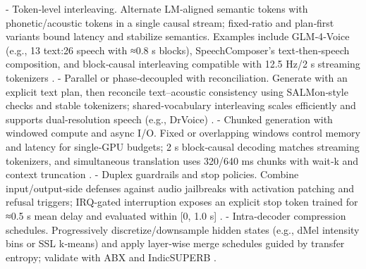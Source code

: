 - Token‑level interleaving. Alternate LM‑aligned semantic tokens with phonetic/acoustic tokens in a single causal stream; fixed‑ratio and plan‑first variants bound latency and stabilize semantics. Examples include GLM‑4‑Voice (e.g., 13 text:26 speech with ≈0.8 s blocks), SpeechComposer’s text‑then‑speech composition, and block‑causal interleaving compatible with 12.5 Hz/2 s streaming tokenizers \cite{zeng2024glm4voicetowardsintelligenthumanlikeends,wu2024speechcomposerunifyingmultiplespeechtask,zeng2024scalingspeechtextpretrainingsyntheticint,har-tuv2025pastphoneticacousticspeechtokenizer,jo2025lmsptalignedsemanticdistillationspeechto,vashishth2024stabspeechtokenizerassessmentbenchmark,cui2025thinkbeforeyoutalkenhancingmeaningfuldia}.
- Parallel or phase‑decoupled with reconciliation. Generate with an explicit text plan, then reconcile text–acoustic consistency using SALMon‑style checks and stable tokenizers; shared‑vocabulary interleaving scales efficiently and supports dual‑resolution speech (e.g., DrVoice) \cite{maimon2025scalinganalysisinterleavedspeechtextlang,maimon2025salmonsuiteacousticlanguagemodelevaluati,tan2025drvoiceparallelspeechtextvoiceconversati,vashishth2024stabspeechtokenizerassessmentbenchmark,wu2024speechcomposerunifyingmultiplespeechtask,zeng2024glm4voicetowardsintelligenthumanlikeends}.
- Chunked generation with windowed compute and async I/O. Fixed or overlapping windows control memory and latency for single‑GPU budgets; 2 s block‑causal decoding matches streaming tokenizers, and simultaneous translation uses 320/640 ms chunks with wait‑k and context truncation \cite{zeng2024scalingspeechtextpretrainingsyntheticint,guo2025streamuniachievingstreamingspeechtransla,maimon2025slammingtrainingspeechlanguagemodelonegp,chen2023reducingbarriersselfsupervisedlearninghu}.
- Duplex guardrails and stop policies. Combine input/output‑side defenses against audio jailbreaks with activation patching and refusal triggers; IRQ‑gated interruption exposes an explicit stop token trained for ≈0.5 s mean delay and evaluated within [0, 1.0 s] \cite{peri2024speechguardexploringadversarialrobustnes,djanibekov2025spiritpatchingspeechlanguagemodelsagains,ma2024languagemodelcanlistenwhilespeaking}.
- Intra‑decoder compression schedules. Progressively discretize/downsample hidden states (e.g., dMel intensity bins or SSL k‑means) and apply layer‑wise merge schedules guided by transfer entropy; validate with ABX and IndicSUPERB \cite{bai2025dmelspeechtokenizationmadesimple,onda2025benchmarkingprosodyencodingdiscretespeec,poli2025fastabxlibraryefficientcomputationabxdis,entry2025indicsuperbspeechprocessinguniversalperf,lu2024fastadaspmultitaskadaptedefficientinfere}.


